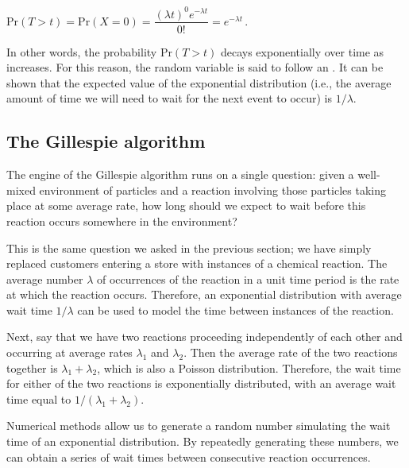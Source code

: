 \begin{center}
$\mathrm{Pr}(T > t) = \mathrm{Pr}(X = 0) = \dfrac{(\lambda t)^0 e^{-\lambda t}}{0!} = e^{-\lambda t}$\,.
\end{center}

In other words, the probability $\mathrm{Pr}(T > t)$ decays exponentially over time as  increases. For this reason, the random variable  is said to follow an . It can be shown that the expected value of the exponential distribution (i.e., the average amount of time we will need to wait for the next event to occur) is $1/\lambda$.\\

\begin{qbox}\end{qbox}


\FloatBarrier
{}
\subsection{The Gillespie algorithm}

The engine of the Gillespie algorithm runs on a single question: given a well-mixed environment of particles and a reaction involving those particles taking place at some average rate, how long should we expect to wait before this reaction occurs somewhere in the environment?

This is the same question we asked in the previous section; we have simply replaced customers entering a store with instances of a chemical reaction. The average number $\lambda$ of occurrences of the reaction in a unit time period is the rate at which the reaction occurs. Therefore, an exponential distribution with average wait time $1/\lambda$ can be used to model the time between instances of the reaction.

Next, say that we have two reactions proceeding independently of each other and occurring at average rates $\lambda_1$ and $\lambda_2$. Then the average rate of the two reactions together is $\lambda_1 + \lambda_2$, which is also a Poisson distribution. Therefore, the wait time for either of the two reactions is exponentially distributed, with an average wait time equal to $1/(\lambda_1 + \lambda_2)$.

Numerical methods allow us to generate a random number simulating the wait time of an exponential distribution. By repeatedly generating these numbers, we can obtain a series of wait times between consecutive reaction occurrences.

